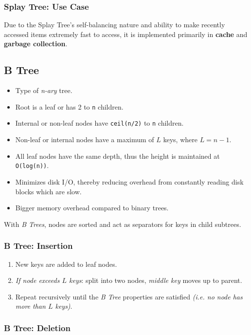 \documentclass[12pt, letterpaper]{article}
\begin{document}
\subsubsection*{Splay Tree: Use Case}

Due to the Splay Tree's self-balancing nature and ability to make recently accessed items extremely fast to access, it is implemented primarily in \textbf{cache} and \textbf{garbage collection}.

\subsection*{B Tree}

\begin{itemize}
    \item Type of \textit{n-ary} tree.
    \item Root is a leaf or has 2 to \texttt{n} children.
    \item Internal or non-leaf nodes have \texttt{ceil(n/2)} to \texttt{n} children.
    \item Non-leaf or internal nodes have a maximum of $ L $ keys, where $ L = n - 1 $.
    \item All leaf nodes have the same depth, thus the height is maintained at \texttt{O(log(n))}.
    \item Minimizes disk I/O, thereby reducing overhead from constantly reading disk blocks which are slow.
    \item Bigger memory overhead compared to binary trees.
\end{itemize}

With \textit{B Trees}, nodes are sorted and act as separators for keys in child subtrees.

\subsubsection*{B Tree: Insertion}

\begin{enumerate}
    \item New keys are added to leaf nodes.
    \item \textit{If node exceeds $ L $ keys}: split into two nodes, \textit{middle key} moves up to parent.
    \item Repeat recursively until the \textit{B Tree} properties are satisfied \textit{(i.e. no node has more than $ L $ keys)}.
\end{enumerate}

\subsubsection*{B Tree: Deletion}
\end{document}
